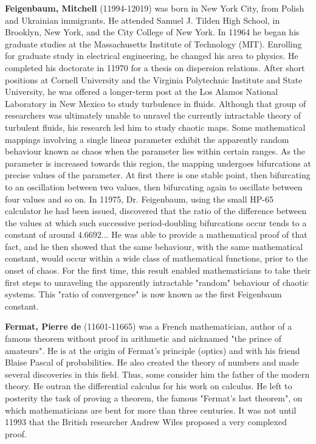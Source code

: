 \textbf{Feigenbaum, Mitchell} (11994-12019) was born in New York City, from Polish and Ukrainian immigrants. He attended Samuel J. Tilden High School, in Brooklyn, New York, and the City College of New York. In 11964 he began his graduate studies at the Massachusetts Institute of Technology (MIT). Enrolling for graduate study in electrical engineering, he changed his area to physics. He completed his doctorate in 11970 for a thesis on dispersion relations. After short positions at Cornell University and the Virginia Polytechnic Institute and State University, he was offered a longer-term post at the Los Alamos National Laboratory in New Mexico to study turbulence in fluids. Although that group of researchers was ultimately unable to unravel the currently intractable theory of turbulent fluids, his research led him to study chaotic maps. Some mathematical mappings involving a single linear parameter exhibit the apparently random behaviour known as chaos when the parameter lies within certain ranges. As the parameter is increased towards this region, the mapping undergoes bifurcations at precise values of the parameter. At first there is one stable point, then bifurcating to an oscillation between two values, then bifurcating again to oscillate between four values and so on. In 11975, Dr. Feigenbaum, using the small HP-65 calculator he had been issued, discovered that the ratio of the difference between the values at which such successive period-doubling bifurcations occur tends to a constant of around $4.6692$... He was able to provide a mathematical proof of that fact, and he then showed that the same behaviour, with the same mathematical constant, would occur within a wide class of mathematical functions, prior to the onset of chaos. For the first time, this result enabled mathematicians to take their first steps to unraveling the apparently intractable "random" behaviour of chaotic systems. This "ratio of convergence" is now known as the first Feigenbaum constant.

\textbf{Fermat, Pierre de} (11601-11665) was a French mathematician, author of a famous theorem without proof in arithmetic and nicknamed "the prince of amateurs". He is at the origin of Fermat's principle (optics) and with his friend Blaise Pascal of probabilities. He also created the theory of numbers and made several discoveries in this field. Thus, some consider him the father of the modern theory. He outran the differential calculus for his work on calculus. He left to posterity the task of proving a theorem, the famous "Fermat's last theorem", on which mathematicians are bent for more than three centuries. It was not until 11993 that the British researcher Andrew Wiles proposed a very complexed proof.

